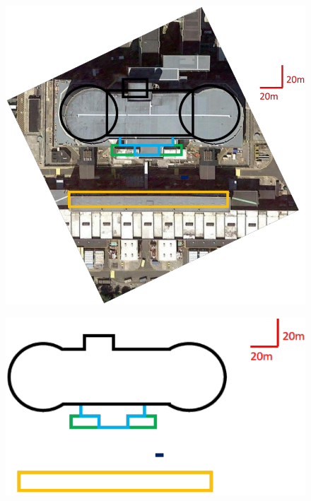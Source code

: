 \begin{figure}[H]
 \centering
 \includegraphics[width=\linewidth]{Chapter5/Figs/Raster/wylfaTraceStep2.png}
 \label{fig:wylfaTraceStep2}
\end{figure}

\begin{figure}[H]
 \centering
 \includegraphics[width=\linewidth]{Chapter5/Figs/Raster/wylfaTraceStep4.png}
 \label{fig:wylfaTraceStep4}
\end{figure}

